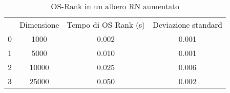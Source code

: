 \begin{table}[H]
\centering
\caption{OS-Rank in un albero RN aumentato}
\label{OS-Rank in un albero RN aumentato}
\begin{tabular}{cccc}
 & Dimensione & Tempo di OS-Rank (s) & Deviazione standard \\
0 & 1000 & 0.002 & 0.001 \\
\cline{1-4}
1 & 5000 & 0.010 & 0.001 \\
\cline{1-4}
2 & 10000 & 0.025 & 0.006 \\
\cline{1-4}
3 & 25000 & 0.050 & 0.002 \\
\cline{1-4}
\end{tabular}
\end{table}
